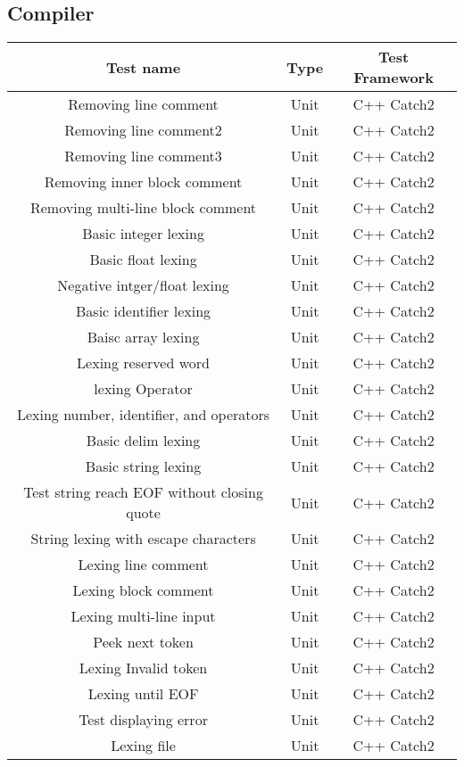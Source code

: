 \documentclass[manuscript,screen,nonacm]{acmart}
\begin{document}
\subsection{Compiler}
\begin{center}
\begin{tabular}{|c|c|c|}
    \hline
    Test name & Type & Test Framework \\
    \hline
    Removing line comment & Unit & C++ Catch2 \\
    Removing line comment2 & Unit & C++ Catch2 \\
    Removing line comment3 & Unit & C++ Catch2 \\
    Removing inner block comment & Unit & C++ Catch2 \\
    Removing multi-line block comment & Unit & C++ Catch2 \\
    Basic integer lexing & Unit & C++ Catch2 \\
    Basic float lexing & Unit & C++ Catch2 \\
    Negative intger/float lexing & Unit & C++ Catch2 \\
    Basic identifier lexing & Unit & C++ Catch2 \\
    Baisc array lexing & Unit & C++ Catch2 \\
    Lexing reserved word & Unit & C++ Catch2 \\
    lexing Operator & Unit & C++ Catch2 \\
    Lexing number, identifier, and operators & Unit & C++ Catch2 \\
    Basic delim lexing & Unit & C++ Catch2 \\
    Basic string lexing & Unit & C++ Catch2 \\
    Test string reach EOF without closing quote & Unit & C++ Catch2 \\
    String lexing with escape characters & Unit & C++ Catch2 \\
    Lexing line comment & Unit & C++ Catch2 \\
    Lexing block comment & Unit & C++ Catch2 \\
    Lexing multi-line input & Unit & C++ Catch2 \\
    Peek next token & Unit & C++ Catch2 \\
    Lexing Invalid token & Unit & C++ Catch2 \\
    Lexing until EOF & Unit & C++ Catch2 \\
    Test displaying error & Unit & C++ Catch2 \\
    Lexing file & Unit & C++ Catch2 \\

\end{tabular}
\end{center}
\end{document}
